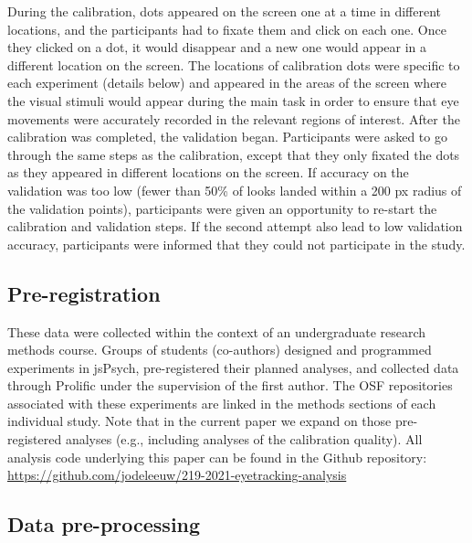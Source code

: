 \documentclass[
  man,floatsintext]{apa6}
\begin{document}
During the calibration, dots appeared on the screen one at a time in
different locations, and the participants had to fixate them and click
on each one. Once they clicked on a dot, it would disappear and a new
one would appear in a different location on the screen. The locations of
calibration dots were specific to each experiment (details below) and
appeared in the areas of the screen where the visual stimuli would
appear during the main task in order to ensure that eye movements were
accurately recorded in the relevant regions of interest. After the
calibration was completed, the validation began. Participants were asked
to go through the same steps as the calibration, except that they only
fixated the dots as they appeared in different locations on the screen.
If accuracy on the validation was too low (fewer than 50\% of looks
landed within a 200 px radius of the validation points),
participants were given an opportunity to re-start the calibration and
validation steps. If the second attempt also lead to low validation
accuracy, participants were informed that they could not participate in
the study.

\hypertarget{pre-registration}{%
\subsection{Pre-registration}\label{pre-registration}}

These data were collected within the context of an undergraduate research methods course. Groups of students (co-authors) designed and programmed experiments in jsPsych, pre-registered their planned analyses, and collected data through Prolific under the supervision of the first author. The OSF repositories associated with these experiments are linked in the methods sections of each individual study. Note that in the current paper we expand on those pre-registered analyses (e.g., including analyses of the calibration quality). All analysis code underlying this paper can be found in the Github repository: \url{https://github.com/jodeleeuw/219-2021-eyetracking-analysis}

\hypertarget{data-pre-processing}{%
\subsection{Data pre-processing}\label{data-pre-processing}}
\end{document}
